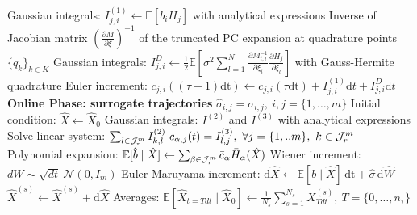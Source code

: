 \documentclass[11pt, a4paper, oneside, reqno]{amsart}
\begin{document}
\begin{algorithm}[H]
\begin{algorithmic}[1]
    \State Gaussian integrals: $I^{(1)}_{j,i}\leftarrow\mathbb{E}[b_iH_j]$ with analytical expressions
    \State Inverse of Jacobian matrix $(\frac{\partial M}{\partial \xi})^{-1}$ of the truncated PC expansion at quadrature points $\{q_k\}_{k\in K}$
    \State Gaussian integrals: $I^{D}_{j,i}\leftarrow\frac{1}{2} \mathbb{E} [ 
    \sigma^2 
    \sum_{l=1}^N\frac{\partial M_{t,l}^{-1}}{\partial \xi_i} 
    \frac{\partial H_j}{\partial \xi_l} 
    ]$ with Gauss-Hermite quadrature
    \State Euler increment: $c_{j,i}((\tau+1)\mathrm{dt}) \leftarrow c_{j,i}(\tau\mathrm{dt}) + I^{(1)}_{j,i} \mathrm{d}t + I^{D}_{j,i}\mathrm{d}t$
\EndFor
\vspace{0.2cm}
\Statex \textbf{Online Phase: surrogate trajectories}
\State $\hat{\sigma}_{i,j}=\sigma_{i,j}, \: i,j=\{1,\dots,m\}$
    \State Initial condition: $\hat{X}\leftarrow\hat{X}_0$
        \State Gaussian integrals: $I^{(2)}$ and $I^{(3)}$ with analytical expressions
        \State Solve linear system: $\sum_{l\in\mathcal{J}_r^m}I^{(2)}_{k,l}\ \Bar{c}_{\alpha,j}(t) = I^{(3)}_{l,j}, \ \forall  j=\{1,..m\}, \ k\in \mathcal{J}_r^m$
        \State Polynomial expansion: $\mathbb{E}[\hat{b} \mid \hat{X}]\leftarrow\sum_{\beta\in\mathcal{J}_r^m}\Bar{c}_\alpha\Bar{H}_{\alpha}(\hat{X})$ 
        \State Wiener increment: $dW \sim \sqrt{dt}\ \mathcal{N}(0,I_m)$
        \State Euler-Maruyama increment: $\mathrm{d}\hat{X} \leftarrow \mathbb{E}[b \mid \hat{X}]\,\mathrm{dt} + \hat{\sigma}\,\mathrm{d}\hat{W}$
        \State $\hat{X}^{(s)} \leftarrow \hat{X}^{(s)} + \mathrm{d}\hat{X}$
    \EndFor
\EndFor
\State Averages: $\mathbb{E}[\hat{X}_{t=Tdt}\mid\hat{X}_0]\leftarrow \frac{1}{N_s}\sum_{s=1}^{N_s}X^{(s)}_{Tdt}, \ T=\{0,\dots,n_\tau\}$ 
\end{algorithmic}
\end{algorithm}



\newpage



\end{document}
